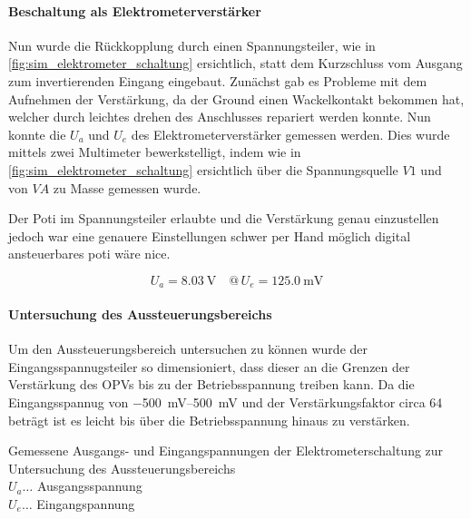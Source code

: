 \documentclass[12pt,english,ngerman]{scrartcl}
\begin{document}
\paragraph{Beschaltung als Elektrometerverstärker}
Nun wurde die Rückkopplung durch einen Spannungsteiler, wie in
\autoref{fig:sim_elektrometer_schaltung} ersichtlich, statt dem Kurzschluss vom
Ausgang zum invertierenden Eingang eingebaut. Zunächst gab es Probleme mit dem
Aufnehmen der Verstärkung, da der Ground einen Wackelkontakt bekommen hat,
welcher durch leichtes drehen des Anschlusses repariert werden konnte.
Nun konnte die $U_a$ und $U_e$ des Elektrometerverstärker gemessen werden. Dies
wurde mittels zwei Multimeter \cite{fluke175} bewerkstelligt, indem wie in
\autoref{fig:sim_elektrometer_schaltung} ersichtlich über die Spannungsquelle
$V1$ und von $VA$ zu Masse gemessen wurde.

Der Poti im Spannungsteiler erlaubte und die Verstärkung genau einzustellen
jedoch war eine genauere Einstellungen schwer per Hand möglich digital
ansteuerbares poti wäre nice.

\begin{equation}
  U_a = \SI{8.03}{\volt} \quad @\, U_e = \SI{125.0}{\milli\volt}
  \label{eq:messwert_elektro_ausgang_eingang}
\end{equation}

\paragraph{Untersuchung des Aussteuerungsbereichs} \label{sec:Versuchohnekond}
Um den Aussteuerungsbereich untersuchen zu können wurde der
Eingangsspannugsteiler so dimensioniert, dass dieser an die Grenzen der
Verstärkung des OPVs bis zu der Betriebsspannung treiben kann. Da die
Eingangsspannug von \SIrange{-500}{500}{\milli\volt} und der Verstärkungsfaktor
circa \num{64} beträgt ist es leicht bis über die Betriebsspannung hinaus zu
verstärken.


\begin{table}[H]
  \caption{Gemessene Ausgangs- und Eingangspannungen der Elektrometerschaltung
  zur Untersuchung des Aussteuerungsbereichs\\
  $U_a \dots$ Ausgangsspannung \\
  $U_e \dots$ Eingangspannung \\
  }
  \label{tab:mess_elektro_aussteurerung}
  \centering
  
\end{table}
\end{document}
